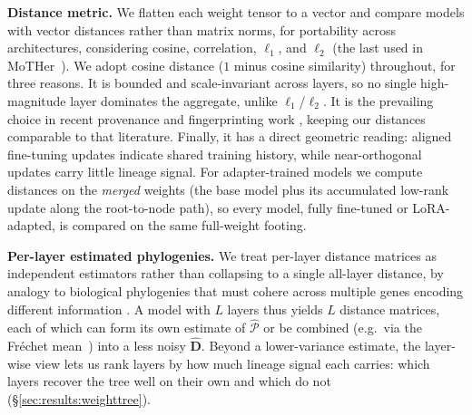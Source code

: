 \documentclass{article}
\theoremstyle{definition}
\theoremstyle{plain}
\begin{document}
\textbf{Distance metric.}\label{sec:framework:metric}
We flatten each weight tensor to a vector and compare models with vector distances rather than matrix
norms, for portability across architectures, considering cosine, correlation, $\ell_1$, and $\ell_2$
(the last used in MoTHer~\citep{horwitz2025mother}). We adopt cosine distance ($1$ minus cosine
similarity) throughout, for three reasons. It is bounded and scale-invariant across layers, so no single
high-magnitude layer dominates the aggregate, unlike $\ell_1$/$\ell_2$. It is the prevailing choice in
recent provenance and fingerprinting work \citep{zeng2024huref, behavioral2026provenance,
zhu2025independence}, keeping our distances comparable to that literature. Finally, it has a direct geometric
reading: aligned fine-tuning updates indicate shared training history, while near-orthogonal updates carry little lineage signal. For adapter-trained models we compute distances on the \emph{merged} weights (the base model plus
its accumulated low-rank update along the root-to-node path), so every model, fully fine-tuned or
LoRA-adapted, is compared on the same full-weight footing.





\textbf{Per-layer estimated phylogenies.}
We treat per-layer distance matrices as independent estimators rather
than collapsing to a single all-layer distance, by analogy to biological phylogenies that must cohere
across multiple genes encoding different information \citep{maddison1997gene}. A model with $L$ layers
thus yields $L$ distance matrices, each of which can form its own estimate of $\widehat{\mathcal{P}}$ or
be combined (e.g.\ via the Fr\'echet mean~\citep{billera2001geometry, willis2019confidence}) into a less noisy $\widehat{\mathbf{D}}$. Beyond a
lower-variance estimate, the layer-wise view lets us rank layers by how much lineage signal each carries:
which layers recover the tree well on their own and which do not (\S\ref{sec:results:weighttree}).
\end{document}
